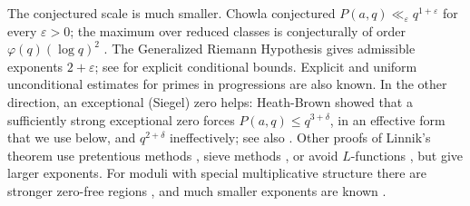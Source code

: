 \documentclass[11pt]{amsart}
\numberwithin{equation}{section}
\theoremstyle{plain}
\theoremstyle{definition}
\theoremstyle{remark}
\newcommand{\eps}{\varepsilon}
\newcommand{\1}{\mathbf{1}}
\begin{document}
The conjectured scale is much smaller. Chowla \cite{Chowla1934least} conjectured
$P(a,q)\ll_\eps q^{1+\eps}$ for every $\eps>0$; the maximum over reduced classes is
conjecturally of order $\varphi(q)(\log q)^2$
\cite{Wagstaff1979greatest,Pomerance1980note,GranvillePomerance1990least,LiPrattShakan2017lower}.
The Generalized Riemann Hypothesis gives admissible exponents $2+\eps$; see
\cite{BachSorenson1996explicit,LamzouriLiSoundararajan2015conditional,CarneiroMilinovichQuesadaHerreraRamos2025fourier}
for explicit conditional bounds. Explicit \cite{BennettMartinOBryantRechnitzer2018explicit} and
uniform \cite{ThornerZaman2024refinements} unconditional estimates for primes in progressions are
also known. In the other direction, an exceptional (Siegel) zero helps: Heath-Brown
\cite{HeathBrown1990siegel} showed that a sufficiently strong exceptional zero forces
$P(a,q)\le q^{3+\delta}$, in an effective form that we use below, and $q^{2+\delta}$ ineffectively; see also
\cite{FriedlanderIwaniec2003exceptional,Iwaniec2006conversations,Zaman2016least}. Other proofs of
Linnik's theorem use pretentious methods \cite{Sachpazis2023pretentious}, sieve methods
\cite{FriedlanderIwaniec2023sifting}, or avoid $L$-functions
\cite{MatomakiMerikoskiTeravainen2024primes}, but give larger exponents. For moduli with special
multiplicative structure there are stronger zero-free regions
\cite{BarbanLinnikChudakov1964prime,Gallagher1972primes,Iwaniec1974zeros}, and much smaller
exponents are known \cite{Chang2014short}.
\end{document}
